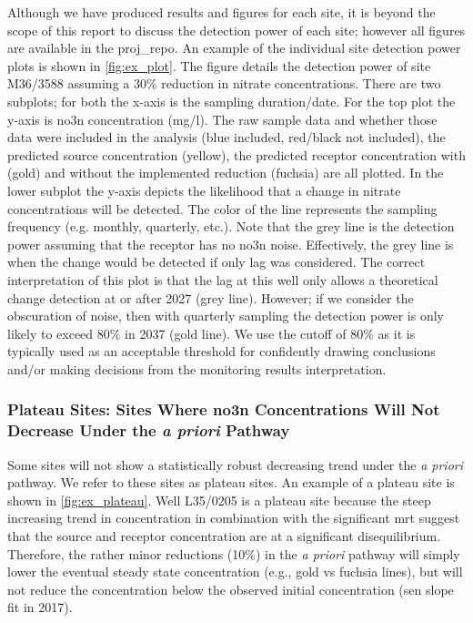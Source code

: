Although we have produced results and figures for each site, it is beyond the scope of this report to discuss the detection power of each site; however all figures are available in the \gls{proj_repo}.
An example of the individual site detection power plots is shown in \autoref{fig:ex_plot}.
The figure details the detection power of site M36/3588 assuming a 30\% reduction in nitrate concentrations.
There are two subplots; for both the x-axis is the sampling duration/date.
For the top plot the y-axis is \gls{no3n} concentration (mg/l).
The raw sample data and whether those data were included in the analysis (blue included, red/black not included), the predicted source concentration (yellow), the predicted receptor concentration with (gold) and without the implemented reduction (fuchsia) are all plotted.
In the lower subplot the y-axis depicts the likelihood that a change in nitrate concentrations will be detected.
The color of the line represents the sampling frequency (e.g. monthly, quarterly, etc.).
Note that the grey line is the detection power assuming that the receptor has no \gls{no3n} noise.
Effectively, the grey line is when the change would be detected if only lag was considered.
The correct interpretation of this plot is that the lag at this well only allows a theoretical change detection at or after 2027 (grey line).
However; if we consider the obscuration of noise, then with quarterly sampling the detection power is only likely to exceed 80\% in 2037 (gold line).
We use the cutoff of 80\% as it is typically used as an acceptable threshold for confidently drawing conclusions and/or making decisions from the monitoring results interpretation\citep{dumont_determining_nodate}.


\subsubsection[Plateau Sites]{Plateau Sites: Sites Where \gls{no3n} Concentrations Will Not Decrease Under the \textit{a priori} Pathway} \label{sec:plateau_results}

Some sites will not show a statistically robust decreasing trend under the \textit{a priori} pathway.
We refer to these sites as plateau sites. An example of a plateau site is shown in \autoref{fig:ex_plateau}.
Well L35/0205 is a plateau site because the steep increasing trend in concentration in combination with the significant \gls{mrt} suggest that the source and receptor concentration are at a significant disequilibrium.
Therefore, the rather minor reductions (10\%) in the \textit{a priori} pathway will simply lower the eventual steady state concentration (e.g., gold vs fuchsia lines), but will not reduce the concentration below the observed initial concentration (sen slope fit in 2017).

